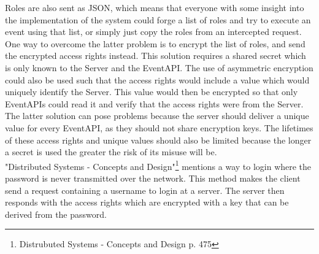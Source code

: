 Roles are also sent as JSON, which means that everyone with some insight into the implementation of the system could forge a list of roles and try to execute an event using that list, or simply just copy the roles from an intercepted request. One way to overcome the latter problem is to encrypt the list of roles, and send the encrypted access rights instead. This solution requires a shared secret which is only known to the Server and the EventAPI. The use of asymmetric encryption could also be used such that the access rights would include a value which would uniquely identify the Server. This value would then be encrypted so that only EventAPIs could read it and verify that the access rights were from the Server. The latter solution can pose problems because the server should deliver a unique value for every EventAPI, as they should not share encryption keys. The lifetimes of these access rights and unique values should also be limited because the longer a secret is used the greater the risk of its misuse will be.\\

"Distributed Systems - Concepts and Design"\footnote{Distrubuted Systems - Concepts and Design p. 475} mentions a way to login where the password is never transmitted over the network. This method makes the client send a request containing a username to login at a server. The server then responds with the access rights which are encrypted with a key that can be derived from the password.